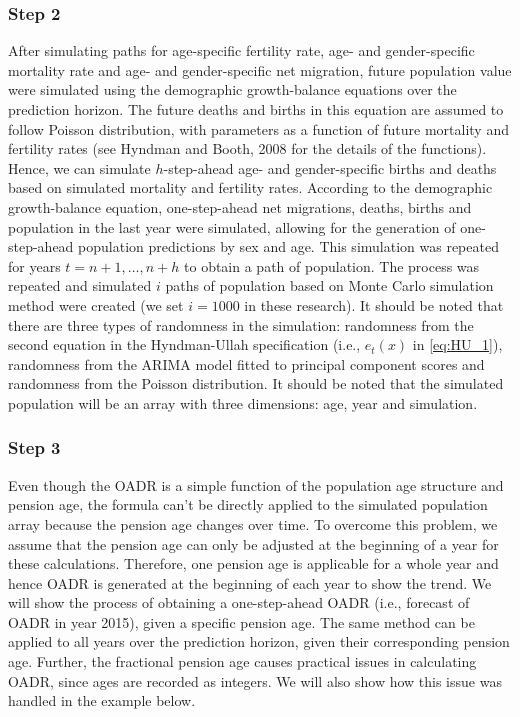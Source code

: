 \documentclass[11pt,a4paper,]{article}
\begin{document}
\hypertarget{step-2}{%
\subsubsection*{Step 2}\label{step-2}}

After simulating paths for age-specific fertility rate, age- and gender-specific mortality rate and age- and gender-specific net migration, future population value were simulated using the demographic growth-balance equations over the prediction horizon. The future deaths and births in this equation are assumed to follow Poisson distribution, with parameters as a function of future mortality and fertility rates (see Hyndman and Booth, 2008 for the details of the functions). Hence, we can simulate \(h\)-step-ahead age- and gender-specific births and deaths based on simulated mortality and fertility rates. According to the demographic growth-balance equation, one-step-ahead net migrations, deaths, births and population in the last year were simulated, allowing for the generation of one-step-ahead population predictions by sex and age. This simulation was repeated for years \(t=n+1,\dots,n+h\) to obtain a path of population. The process was repeated and simulated \(i\) paths of population based on Monte Carlo simulation method were created (we set \(i=1000\) in these research). It should be noted that there are three types of randomness in the simulation: randomness from the second equation in the Hyndman-Ullah specification (i.e., \(e_t(x)\) in \eqref{eq:HU_1}), randomness from the ARIMA model fitted to principal component scores and randomness from the Poisson distribution. It should be noted that the simulated population will be an array with three dimensions: age, year and simulation.

\hypertarget{step-3}{%
\subsubsection*{Step 3}\label{step-3}}

Even though the OADR is a simple function of the population age structure and pension age, the formula can't be directly applied to the simulated population array because the pension age changes over time. To overcome this problem, we assume that the pension age can only be adjusted at the beginning of a year for these calculations. Therefore, one pension age is applicable for a whole year and hence OADR is generated at the beginning of each year to show the trend. We will show the process of obtaining a one-step-ahead OADR (i.e., forecast of OADR in year 2015), given a specific pension age. The same method can be applied to all years over the prediction horizon, given their corresponding pension age. Further, the fractional pension age causes practical issues in calculating OADR, since ages are recorded as integers. We will also show how this issue was handled in the example below.
\end{document}

